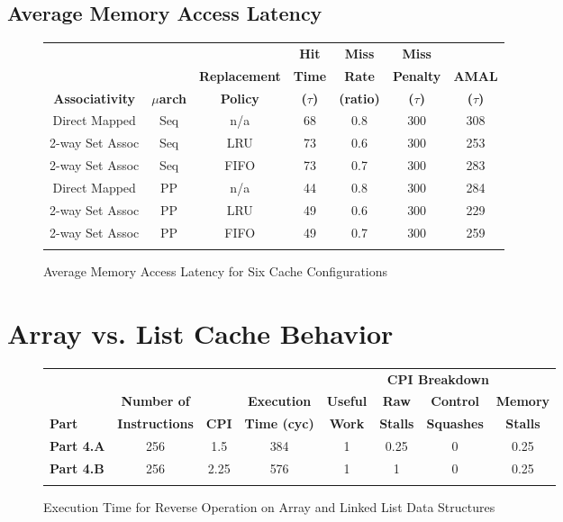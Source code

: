 \documentclass[10pt]{article}
\begin{document}
\subsection{Average Memory Access Latency}
\begin{figure}[H]
\centering
\begin{tabular}{@{\extracolsep{3pt}}ccccccc@{}}
\Xhline{2\arrayrulewidth}
& & & \textbf{Hit} & \textbf{Miss} & \textbf{Miss} & \\
& & \textbf{Replacement} & \textbf{Time} & \textbf{Rate} & \textbf{Penalty} & \textbf{AMAL} \\
\textbf{Associativity} & \textbf{$\mu$arch} & \textbf{Policy} & \textbf{($\tau$)} & \textbf{(ratio)} & \textbf{($\tau$)} & \textbf{($\tau$)} \\
\Xhline{2\arrayrulewidth}
Direct Mapped   & Seq & n/a & 68 & 0.8 & 300 & 308\\
2-way Set Assoc & Seq & LRU & 73 & 0.6 & 300 & 253\\
2-way Set Assoc & Seq & FIFO& 73 & 0.7 & 300 & 283\\
Direct Mapped   & PP  & n/a & 44 & 0.8 & 300 & 284\\
2-way Set Assoc & PP  & LRU & 49 & 0.6 & 300 & 229\\
2-way Set Assoc & PP  & FIFO& 49 & 0.7 & 300 & 259\\
\Xhline{2\arrayrulewidth}
\end{tabular}
\caption{Average Memory Access Latency for Six Cache Configurations}
\end{figure}

\cleardoublepage
\section{Array vs. List Cache Behavior}
\begin{figure}[H]
\centering
\begin{tabular}{@{\extracolsep{3pt}}lccccccc@{}}
\Xhline{2\arrayrulewidth}
& & & & \multicolumn{4}{c}{\textbf{CPI Breakdown}}\\
\cline{5-8}
& \textbf{Number of} & & \textbf{Execution} & \textbf{Useful} & \textbf{Raw} & \textbf{Control} & \textbf{Memory} \\
\textbf{Part} & \textbf{Instructions} & \textbf{CPI} & \textbf{Time (cyc)} & \textbf{Work} & \textbf{Stalls} & \textbf{Squashes} & \textbf{Stalls}\\
\hline
\textbf{Part 4.A} & 256 & 1.5 & 384 & 1 & 0.25 & 0 & 0.25\\
\hline
\textbf{Part 4.B} & 256 & 2.25 & 576 & 1 & 1 & 0 & 0.25\\
\Xhline{2\arrayrulewidth}
\end{tabular}
\caption{Execution Time for Reverse Operation on Array and Linked List Data Structures}
\end{figure}
\end{document}

